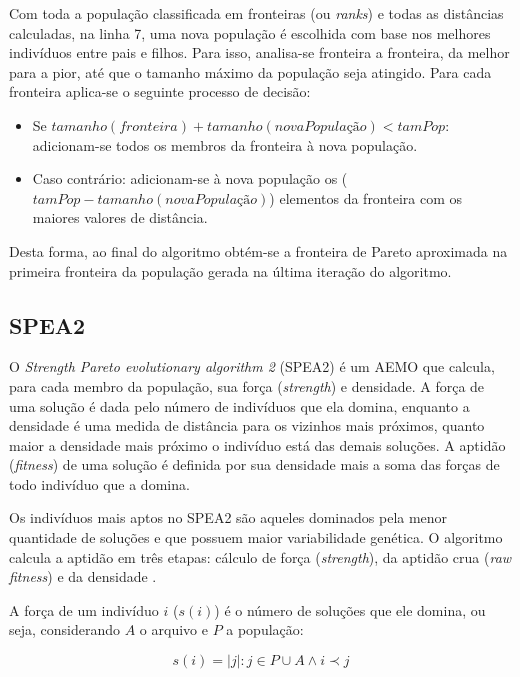 Com toda a população classificada em fronteiras (ou \textit{ranks}) e todas as distâncias calculadas, na linha 7, uma nova população é escolhida com base nos melhores indivíduos entre pais e filhos. Para isso, analisa-se fronteira a fronteira, da melhor para a pior, até que o tamanho máximo da população seja atingido. Para cada fronteira aplica-se o seguinte processo de decisão:

\begin{itemize}  
	\item Se $tamanho(fronteira) + tamanho(novaPopulação) < tamPop$: adicionam-se todos os membros da fronteira à nova população.
	\item Caso contrário: adicionam-se à nova população os ($tamPop - tamanho(novaPopulação)$) elementos da fronteira com os maiores valores de distância.
\end{itemize}

Desta forma, ao final do algoritmo obtém-se a fronteira de Pareto aproximada na primeira fronteira da população gerada na última iteração do algoritmo.

\subsection{SPEA2}

O \textit{Strength Pareto evolutionary algorithm 2} (SPEA2) \cite{Zitzler2002} é um AEMO que calcula, para cada membro da população, sua força (\textit{strength}) e densidade. A força de uma solução é dada pelo número de indivíduos que ela domina, enquanto a densidade é uma medida de distância para os vizinhos mais próximos, quanto maior a densidade mais próximo o indivíduo está das demais soluções. A aptidão (\textit{fitness}) de uma solução é definida por sua densidade mais a soma das forças de todo indivíduo que a domina. 

Os indivíduos mais aptos no SPEA2 são aqueles dominados pela menor quantidade de soluções e que possuem maior variabilidade genética. O algoritmo calcula a aptidão em três etapas: cálculo de força (\textit{strength}), da aptidão crua (\textit{raw fitness}) e da densidade \cite{Zitzler2002}.

A força de um indivíduo $i$ ($s(i)$) é o número de soluções que ele domina, ou seja, considerando $A$ o arquivo e $P$ a população:

\begin{equation}s(i) = |j|: j \in P \cup A \land i \prec j\end{equation}

